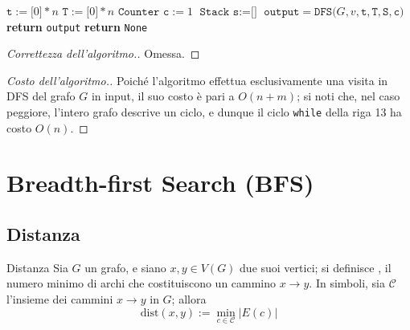 \documentclass[a4paper, 12pt]{report}
\begin{document}
    \begin{nocaptionalg}
        \begin{algorithmic}[1]
                \State $\texttt{t} := \texttt{[}0\texttt{]} * n$
                \State $\texttt{T} := \texttt{[}0\texttt{]} * n$
                \State $\texttt{Counter c} := 1$
                \State $\texttt{Stack s} := \texttt{[]}$
                        \State $\texttt{output} = \texttt{DFS(}G, v, \texttt{t}, \texttt{T}, \texttt{S}, \texttt{c)}$
                            \State \textbf{return} \texttt{output}
                        \EndIf
                    \EndIf
                \EndFor
                \State \textbf{return} \texttt{None}
            \EndFunction
        \end{algorithmic}
    \end{nocaptionalg}

    \begin{proof}[Correttezza dell'algoritmo.]
        Omessa.
    \end{proof}

    \begin{proof}[Costo dell'algoritmo.]
        Poiché l'algoritmo effettua esclusivamente una visita in DFS del grafo $G$ in input, il suo costo è pari a $O(n + m)$; si noti che, nel caso peggiore, l'intero grafo descrive un ciclo, e dunque il ciclo \texttt{while} della riga 13 ha costo $O(n)$.
    \end{proof}

    \section{Breadth-first Search (BFS)}

    \subsection{Distanza}

    \begin{frameddefn}[label={distanza}]{Distanza}
        Sia $G$ un grafo, e siano $x, y \in V(G)$ due suoi vertici; si definisce , il numero minimo di archi che costituiscono un cammino $x \rightarrow y$. In simboli, sia $\mathcal{C}$ l'insieme dei cammini $x \rightarrow y$ in $G$; allora $$\mathrm{dist}(x, y) := \min_{c \in \mathcal{C}}{\left |E(c) \right|}$$
    \end{frameddefn}
\end{document}
